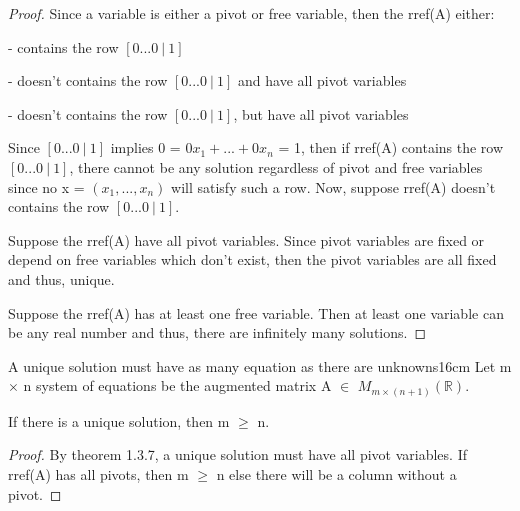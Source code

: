     \begin{proof}
        Since a variable is either a pivot or free variable,
        then the rref(A) either:
        
        \hspace{0.5cm}
        - contains the row $[0 ... 0 \ | \ 1]$

        \hspace{0.5cm}
        - doesn't contains the row $[0 ... 0 \ | \ 1]$
        and have all pivot variables

        \hspace{0.5cm}
        - doesn't contains the row $[0 ... 0 \ | \ 1]$,
        but have all pivot variables

        Since $[0 ... 0 \ | \ 1]$ implies 0 = $0x_1 + ... + 0x_n$ = 1,
        then if rref(A) contains the row $[0 ... 0 \ | \ 1]$,
        there cannot be any solution regardless of pivot and free
        variables since no x = $(x_1,...,x_n)$ will satisfy such a row.
        Now, suppose rref(A) doesn't contains the row $[0 ... 0 \ | \ 1]$.
        
        Suppose the rref(A) have all pivot variables.
        Since pivot variables are fixed or depend on free
        variables which don't exist, then the pivot variables are all fixed
        and thus, unique.

        Suppose the rref(A) has at least one free variable.
        Then at least one variable can be any real number and thus,
        there are infinitely many solutions.
    \end{proof}

    \newpage



    \begin{corollary}{A unique solution must have as many equation as there
    are unknowns}{16cm}
        Let m $\times$ n system of equations be the
        augmented matrix A $\in$ $M_{m \times (n+1)}(\mathbb{R})$.

        If there is a unique solution, then m $\geq$ n.
    \end{corollary}

    \begin{proof}
        By {\color{red} theorem 1.3.7}, a unique solution must
        have all pivot variables. If rref(A) has all pivots,
        then m $\geq$ n else there will be a column without a pivot.
    \end{proof}

    \vspace{0.5cm}




